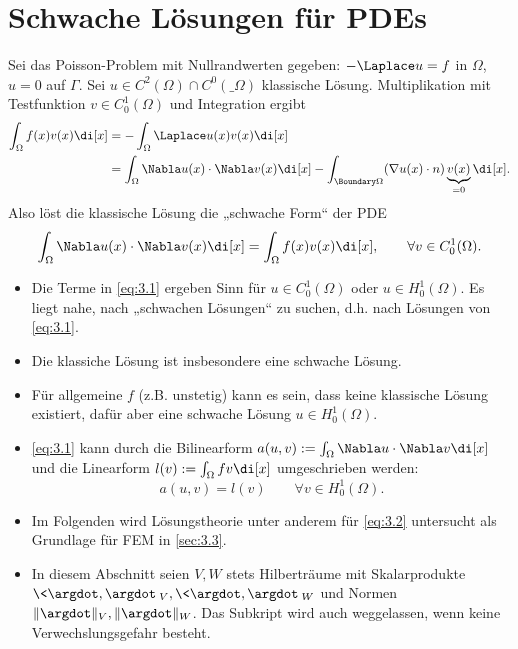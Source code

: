 
\section{Schwache Lösungen für PDEs} \label{sec:3.2}

Sei das Poisson-Problem mit Nullrandwerten gegeben: $-\Laplace u = f$ in $\Omega$, $u = 0$ auf $\Gamma$.
Sei $u \in C^2(\Omega) \cap C^0(\_\Omega)$ klassische Lösung.
Multiplikation mit Testfunktion $v \in C_0^1(\Omega)$ und Integration ergibt
\begin{align*}
	\int_\Omega f(x) v(x) \di[x] &= - \int_\Omega \Laplace u(x) v(x) \di[x] \\
	&= \int_\Omega \Nabla u(x) \cdot \Nabla v(x) \di[x] - \int_{\Boundary \Omega} (\nabla u(x) \cdot n) \underbrace{v(x)}_{=0} \di[x].
\end{align*}
Also löst die klassische Lösung die „schwache Form“ der PDE
\begin{equation} \label{eq:3.1}
	\int_\Omega \Nabla u(x) \cdot \Nabla v(x) \di[x]
	= \int_\Omega f(x) v(x) \di[x],
	\qquad \forall v \in C_0^1(\Omega).
\end{equation}
\begin{itemize}
	\item
		Die Terme in \eqref{eq:3.1} ergeben Sinn für $u\in C_0^1(\Omega)$ oder $u \in H_0^1(\Omega)$.
		Es liegt nahe, nach „schwachen Lösungen“ zu suchen, d.h. nach Lösungen von \eqref{eq:3.1}.
	\item
		Die klassiche Lösung ist insbesondere eine schwache Lösung.
	\item
		Für allgemeine $f$ (z.B. unstetig) kann es sein, dass keine klassische Lösung existiert, dafür aber eine schwache Lösung $u \in H_0^1(\Omega)$.
	\item
		\eqref{eq:3.1} kann durch die Bilinearform $a(u,v) := \int_\Omega \Nabla u \cdot \Nabla v \di[x]$ und die Linearform $l(v) := \int_\Omega fv \di[x]$ umgeschrieben werden:
		\begin{equation} \label{eq:3.2}
			a(u,v) = l(v) \qquad \forall v \in H_0^1(\Omega).
		\end{equation}
	\item
		Im Folgenden wird Lösungstheorie unter anderem für \eqref{eq:3.2} untersucht als Grundlage für FEM in \ref{sec:3.3}.
	\item
		In diesem Abschnitt seien $V, W$ stets Hilberträume mit Skalarprodukte $\<\argdot, \argdot\>_V, \<\argdot, \argdot\>_W$ und Normen $\|\argdot\|_V, \|\argdot\|_W$.
		Das Subkript wird auch weggelassen, wenn keine Verwechslungsgefahr besteht.
\end{itemize}

